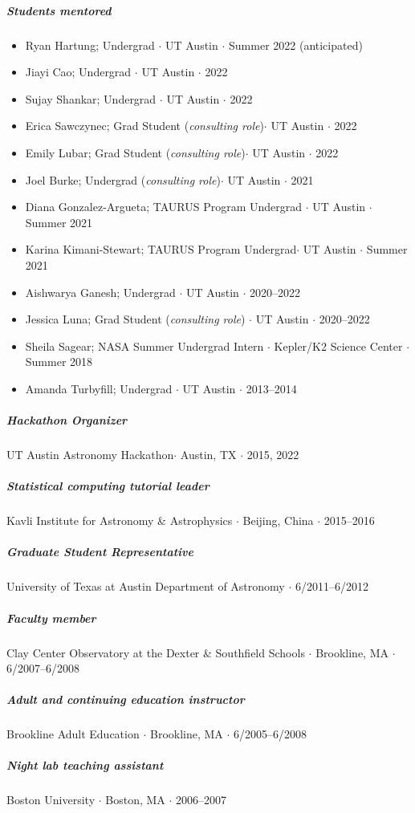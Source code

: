 \documentclass[10pt,letterpaper]{article}
\begin{document}
\subparagraph{Students mentored}
\begin{itemize}
    \item Ryan Hartung; Undergrad $\cdot$ UT Austin $\cdot$ Summer 2022 (anticipated)
    \item Jiayi Cao; Undergrad $\cdot$ UT Austin $\cdot$ 2022
    \item Sujay Shankar; Undergrad $\cdot$ UT Austin $\cdot$ 2022
    \item Erica Sawczynec; Grad Student (\emph{consulting role})$\cdot$ UT Austin $\cdot$ 2022
    \item Emily Lubar; Grad Student (\emph{consulting role})$\cdot$ UT Austin $\cdot$ 2022
    \item Joel Burke; Undergrad (\emph{consulting role})$\cdot$ UT Austin $\cdot$ 2021
    \item Diana Gonzalez-Argueta; TAURUS Program Undergrad $\cdot$ UT Austin $\cdot$ Summer 2021
    \item Karina Kimani-Stewart; TAURUS Program Undergrad$\cdot$ UT Austin $\cdot$ Summer 2021
    \item Aishwarya Ganesh; Undergrad $\cdot$ UT Austin $\cdot$  2020--2022
    \item Jessica Luna; Grad Student (\emph{consulting role}) $\cdot$ UT Austin $\cdot$  2020--2022
    \item Sheila Sagear; NASA Summer Undergrad Intern $\cdot$ Kepler/K2 Science Center $\cdot$ Summer 2018
    \item Amanda Turbyfill; Undergrad $\cdot$ UT Austin $\cdot$ 2013--2014
\end{itemize}


\subparagraph{Hackathon Organizer}
UT Austin Astronomy Hackathon$\cdot$ Austin, TX $\cdot$ 2015, 2022

\subparagraph{Statistical computing tutorial leader}
Kavli Institute for Astronomy \& Astrophysics $\cdot$ Beijing, China $\cdot$ 2015--2016

\subparagraph{Graduate Student Representative}
University of Texas at Austin Department of Astronomy $\cdot$ 6/2011--6/2012

\subparagraph{Faculty member}
Clay Center Observatory at the Dexter \& Southfield Schools  $\cdot$ Brookline, MA $\cdot$ 6/2007--6/2008

\subparagraph{Adult and continuing education instructor}
Brookline Adult Education  $\cdot$ Brookline, MA $\cdot$ 6/2005--6/2008

\subparagraph{Night lab teaching assistant}
Boston University $\cdot$ Boston, MA $\cdot$ 2006--2007
\end{document}
